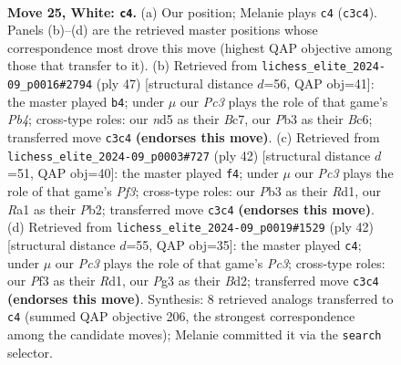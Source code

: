 \documentclass[11pt]{article}
\begin{document}
\clearpage

\begin{figure}[p]\centering
\begin{subfigure}{0.46\textwidth}\centering
\resizebox{\linewidth}{!}{%
\newchessgame
\chessboard[
  setfen={r5k1/pbpp4/1p5p/3n1pp1/8/NPP2PP1/P2PBK1P/R7 w - - 1 25},
  showmover=false,
  pgfstyle=straightmove, color=movearrow, markmove={c3-c4}
]}
\caption{}
\end{subfigure}\hfill
\begin{subfigure}{0.46\textwidth}\centering
\resizebox{\linewidth}{!}{%
\newchessgame
\chessboard[
  setfen={1r6/2b1kppp/p1b1p3/1p2P2P/5PP1/P1N5/1PP1B3/1K3R2 b - - 0 24},
  showmover=false,
  pgfstyle=straightmove, color=movearrow, markmove={b5-b4}
]}
\caption{}
\end{subfigure}
\\[4pt]
\begin{subfigure}{0.46\textwidth}\centering
\resizebox{\linewidth}{!}{%
\newchessgame
\chessboard[
  setfen={r4k2/pb3p2/1p2p2p/1N2n1p1/8/P3PPP1/1P2BK1P/3R4 w - - 1 22},
  showmover=false,
  pgfstyle=straightmove, color=movearrow, markmove={f3-f4}
]}
\caption{}
\end{subfigure}\hfill
\begin{subfigure}{0.46\textwidth}\centering
\resizebox{\linewidth}{!}{%
\newchessgame
\chessboard[
  setfen={4k2r/5ppp/ppN1pb2/3n4/P7/2P3P1/1P1B1P1P/3R2K1 w k - 3 22},
  showmover=false,
  pgfstyle=straightmove, color=movearrow, markmove={c3-c4}
]}
\caption{}
\end{subfigure}
\caption{\textbf{Move 25, White: \texttt{c4}.} (a) Our position; Melanie plays \texttt{c4} (\texttt{c3c4}). Panels (b)--(d) are the retrieved master positions whose correspondence most drove this move (highest QAP objective among those that transfer to it). (b) Retrieved from \texttt{lichess\_elite\_2024-09\_p0016\#2794} (ply 47) [structural distance $d$=56, QAP obj=41]: the master played \texttt{b4}; under $\mu$ our \emph{Pc3} plays the role of that game's \emph{Pb4}; cross-type roles: our \emph{n}d5 as their \emph{B}c7, our \emph{P}b3 as their \emph{B}c6; transferred move \texttt{c3c4} \textbf{(endorses this move)}. (c) Retrieved from \texttt{lichess\_elite\_2024-09\_p0003\#727} (ply 42) [structural distance $d$=51, QAP obj=40]: the master played \texttt{f4}; under $\mu$ our \emph{Pc3} plays the role of that game's \emph{Pf3}; cross-type roles: our \emph{P}b3 as their \emph{R}d1, our \emph{R}a1 as their \emph{P}b2; transferred move \texttt{c3c4} \textbf{(endorses this move)}. (d) Retrieved from \texttt{lichess\_elite\_2024-09\_p0019\#1529} (ply 42) [structural distance $d$=55, QAP obj=35]: the master played \texttt{c4}; under $\mu$ our \emph{Pc3} plays the role of that game's \emph{Pc3}; cross-type roles: our \emph{P}f3 as their \emph{R}d1, our \emph{P}g3 as their \emph{B}d2; transferred move \texttt{c3c4} \textbf{(endorses this move)}. Synthesis: 8 retrieved analogs transferred to \texttt{c4} (summed QAP objective 206, the strongest correspondence among the candidate moves); Melanie committed it via the \texttt{search} selector.}
\label{fig:thought-m48}
\end{figure}
\end{document}
